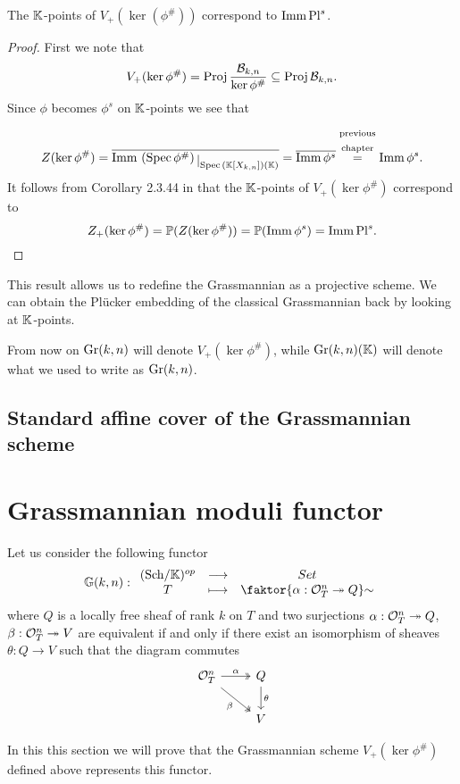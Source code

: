 \begin{proposition}
The $\mathbb{K}$-points of $V_+(\ker(\phi^\#))$ correspond to $\mathrm{Imm}\, \mathrm{Pl}^s$.
\end{proposition}
\begin{proof}
First we note that
\[V_+(\ker\phi^\#)=\mathrm{Proj}\,\frac{\mathcal{B}_{k,n}}{\ker\phi^\#}\subseteq \mathrm{Proj}\,\mathcal{B}_{k,n}.\]
Since $\phi$ becomes $\phi^s$ on $\mathbb{K}$-points we see that
\[Z(\ker\phi^\#)=\ol{\imm \pa{\Spec\phi^\#}\res{\Spec(\K[X_{k,n}])(\K)}}=\ol{\imm \phi^s}\pasgnl={$\emat{\text{previous}\\\text{chapter}}$}\imm \phi^s.\] 
It follows from Corollary 2.3.44 in \cite{QingLiu} that the $\mathbb{K}$-points of $V_+(\ker\phi^\#)$ correspond to 
\[Z_+(\ker\phi^\#)=\mathbb{P}(Z(\ker\phi^\#))=\mathbb{P}(\mathrm{Imm}\, \phi^s)=\mathrm{Imm}\, \mathrm{Pl}^s.\]
\end{proof}

\noindent This result allows us to redefine the Grassmannian as a projective scheme. We can obtain the Pl\"ucker embedding of the classical Grassmannian back by looking at $\mathbb{K}$-points.
\medskip

\noindent From now on $\mathrm{Gr}(k,n)$ will denote $V_+(\ker \phi^\#)$, while $\mathrm{Gr}(k,n)(\mathbb{K})$ will denote what we used to write as $\mathrm{Gr}(k,n)$.

\subsection{Standard affine cover of the Grassmannian scheme}






\section{Grassmannian moduli functor}

Let us consider the following functor
\[\G(k,n):\funcDef{(\Sch\K)\op}{Set}{T}{\quot{\cpa{\al:\Oc_T^n\onto Q}}\sim}\]
where $Q$ is a locally free sheaf of rank $k$ on $T$ and two surjections $\alpha:\mathcal{O}_T^n\twoheadrightarrow Q$, $\beta:\mathcal{O}_T^n\twoheadrightarrow V$ are equivalent if and only if there exist an isomorphism of sheaves $\theta:Q\to V$ such that the diagram commutes
\[\begin{tikzcd}
	{\Oc_T^n} & Q \\
	& V
	\arrow["\al", two heads, from=1-1, to=1-2]
	\arrow["\beta"', two heads, from=1-1, to=2-2]
	\arrow["\theta", from=1-2, to=2-2]
\end{tikzcd}\]

\noindent In this this section we will prove that the Grassmannian scheme $V_+(\ker\phi^\#)$ defined above represents this functor.

